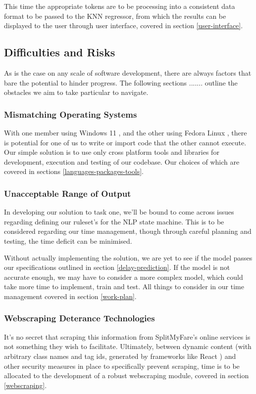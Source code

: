 \documentclass[11pt]{article}
\newcounter{subsubsubsection}[subsubsection]
\begin{document}
This time the appropriate tokens are to be processing into a consistent data format to be passed to the KNN regressor, from which the results can be displayed to the user through user interface, covered in section \ref{user-interface}.


\subsection{Difficulties and Risks} \label{difficulties-risks}

As is the case on any scale of software development, there are always factors that bare the potential to hinder progress. The following sections ....... outline the obstacles we aim to take particular to navigate.

\subsubsection{Mismatching Operating Systems} \label{mismatching-os}

With one member using Windows 11 \cite{windows}, and the other using Fedora Linux \cite{fedora}, there is potential for one of us to write or import code that the other cannot execute. Our simple solution is to use only cross platform tools and libraries for development, execution and testing of our codebase. Our choices of which are covered in sections \ref{languages-packages-tools}.

\subsubsection{Unacceptable Range of Output} \label{unacceptable-output}

In developing our solution to task one, we'll be bound to come across issues regarding defining our ruleset's for the NLP state machine. This is to be considered regarding our time management, though through careful planning and testing, the time deficit can be minimised.

Without actually implementing the solution, we are yet to see if the model passes our specifications outlined in section \ref{delay-prediction}. If the model is not accurate enough, we may have to consider a more complex model, which could take more time to implement, train and test. All things to consider in our time management covered in section \ref{work-plan}.

\subsubsection{Webscraping Deterance Technologies} \label{webscrape-deterance}
It's no secret that scraping this information from SplitMyFare's online services is not something they wish to facilitate. Ultimately, between dynamic content (with arbitrary class names and tag ids, generated by frameworks like React \cite{react}) and other security measures in place to specifically prevent scraping, time is to be allocated to the development of a robust webscraping module, covered in section \ref{webscraping}.
\end{document}
